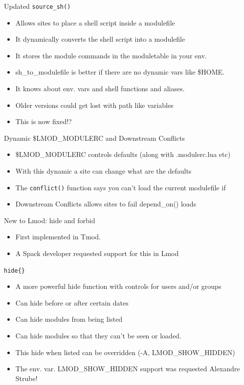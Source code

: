 \documentclass{beamer}
\begin{document}
\begin{frame}{Updated \texttt{source\_sh()}}
  \begin{itemize}
    \item Allows sites to place a shell script inside a modulefile
    \item It dynamically converts the shell script into a modulefile
    \item It stores the module commands in the moduletable in your
      env.
    \item sh\_to\_modulefile is better if there are no dynamic vars
      like \$HOME.
    \item It knows about env. vars and shell functions and aliases.
    \item Older versions could get lost with path like variables
    \item This is now fixed!?
  \end{itemize}
\end{frame}

\begin{frame}{Dynamic \$LMOD\_MODULERC and Downstream Conflicts}
  \begin{itemize}
    \item \$LMOD\_MODULERC controls defaults (along with .modulerc.lua etc)
    \item With this dynamic a site can change what are the defaults
    \item The \texttt{conflict()} function says you can't load the
      current modulefile if 
    \item Downstream Conflicts allows sites to fail depend\_on() loads 
  \end{itemize}
\end{frame}

\begin{frame}{New to Lmod: hide and forbid}
  \begin{itemize}
    \item First implemented in Tmod.
    \item A Spack developer requested support for this in Lmod
  \end{itemize}
\end{frame}

\begin{frame}{\texttt{hide\{\}}}
  \begin{itemize}
    \item A more powerful hide function with controls for users and/or
      groups
    \item Can hide before or after certain dates
    \item Can hide modules from being listed
    \item Can hide modules so that they can't be seen or loaded.
    \item This hide when listed can be overridden (-A, LMOD\_SHOW\_HIDDEN)
    \item The env. var.  LMOD\_SHOW\_HIDDEN support was requested Alexandre Strube!
  \end{itemize}
\end{frame}
\end{document}
